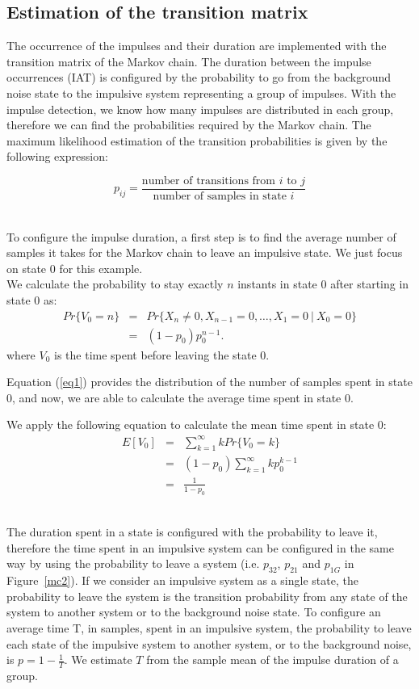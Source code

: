 \documentclass[journal]{IEEEtran}
\begin{document}
\subsection{Estimation of the transition matrix}
The occurrence of the impulses and their duration are implemented with the transition matrix of the Markov chain. The duration between the impulse occurrences (IAT) is configured by the probability to go from the background noise state to the impulsive system representing a group of impulses. With the impulse detection, we know how many impulses are distributed in each group, therefore we can find the probabilities required by the Markov chain. The maximum likelihood estimation of the transition probabilities is given by the following expression:

\begin{equation}\label{pij}
    p_{ij}=\frac{\mbox{number of transitions from $i$ to $j$}}{\mbox{number of samples in state $i$}}
\end{equation}
\

To configure the impulse duration, a first step is to find the average number of samples it takes for the Markov chain to leave an impulsive state. We just focus on state 0 for this example.\\
We calculate the probability to stay exactly $n$ instants in state 0 after starting in state 0 as:
\small
\begin{eqnarray}
Pr\{V_{0}=n\}&=& Pr\{X_{n}\neq0,X_{n-1}=0,\dots,X_1=0\ |\ X_0=0\}\nonumber\\
&=&(1-p_0)p_0^{n-1}. \label{eq1}
\end{eqnarray}
\normalsize
where $V_0$ is the time spent before leaving the state 0.\

Equation (\ref{eq1}) provides the distribution of the number of samples spent in state 0, and now, we are able to calculate the average time spent in state 0.\

We apply the following equation to calculate the mean time spent in state 0:
\begin{eqnarray}\label{EV00}
  E[V_{0}]&=&\sum\limits_{k=1}^{\infty}kPr\{V_{0}=k\}\nonumber \\
&=& (1-p_0)\sum\limits_{k=1}^{\infty}k p_0^{k-1}\nonumber \\
&=&\frac{1}{1-p_0}
\end{eqnarray}\

The duration spent in a state is configured with the probability to leave it, therefore the time spent in an impulsive system can be configured in the same way by using the probability to leave a system (i.e. $p_{32}$, $p_{21}$ and $p_{1G}$ in Figure~\ref{mc2}). If we consider an impulsive system as a single state, the probability to leave the system is the transition probability from any state of the system to another system or to the background noise state. To configure an average time T, in samples, spent in an impulsive system, the probability to leave each state of the impulsive system to another system, or to the background noise, is $p=1-\frac{1}{T}$. We estimate $T$ from the sample mean of the impulse duration of a group.
\end{document}
